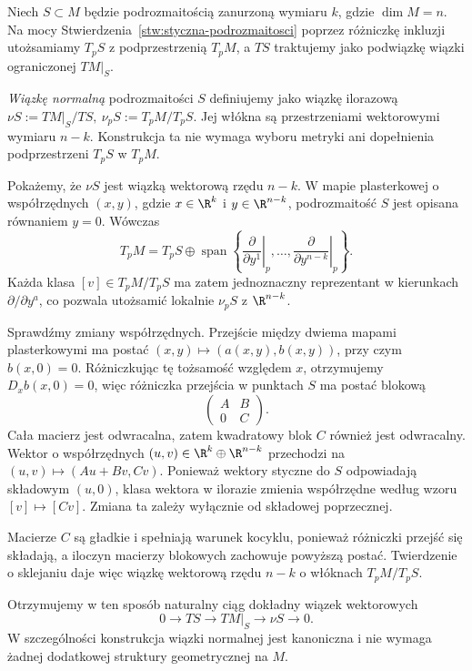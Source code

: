\begin{przyklad}
Niech $S\subset M$ będzie podrozmaitością zanurzoną wymiaru $k$,
gdzie $\dim M=n$. Na mocy Stwierdzenia~\ref{stw:styczna-podrozmaitosci}
poprzez różniczkę inkluzji utożsamiamy
$T_pS$ z podprzestrzenią $T_pM$, a $TS$ traktujemy jako
podwiązkę wiązki ograniczonej $TM|_S$.

\emph{Wiązkę normalną} podrozmaitości $S$ definiujemy jako
wiązkę ilorazową $\nu S:=TM|_S/TS, \ \nu_pS:=T_pM/T_pS$.
Jej włókna są przestrzeniami wektorowymi wymiaru $n-k$.
Konstrukcja ta nie wymaga wyboru metryki ani dopełnienia
podprzestrzeni $T_pS$ w $T_pM$.

Pokażemy, że $\nu S$ jest wiązką wektorową rzędu $n-k$.
W mapie plasterkowej o współrzędnych $(x,y)$, gdzie
$x\in\R^k$ i $y\in\R^{n-k}$, podrozmaitość $S$ jest
opisana równaniem $y=0$. Wówczas
\[
T_pM=T_pS\oplus
\operatorname{span}\left\{
\left.\frac{\partial}{\partial y^1}\right|_p,
\ldots,
\left.\frac{\partial}{\partial y^{n-k}}\right|_p
\right\}.
\]
Każda klasa $[v]\in T_pM/T_pS$ ma zatem jednoznaczny
reprezentant w kierunkach $\partial/\partial y^a$,
co pozwala utożsamić lokalnie $\nu_pS$ z $\R^{n-k}$.

Sprawdźmy zmiany współrzędnych. Przejście między dwiema
mapami plasterkowymi ma postać $(x,y)\longmapsto(a(x,y),b(x,y))$,
przy czym $b(x,0)=0$. Różniczkując tę tożsamość
względem $x$, otrzymujemy $D_xb(x,0)=0$, więc
różniczka przejścia w punktach $S$ ma postać blokową
\[
\begin{pmatrix}
A&B\\
0&C
\end{pmatrix}.
\]
Cała macierz jest odwracalna, zatem kwadratowy blok
$C$ również jest odwracalny. Wektor o współrzędnych
$(u,v)\in\R^k\oplus\R^{n-k}$ przechodzi na $(u,v)\longmapsto(Au+Bv,Cv)$.
Ponieważ wektory styczne do $S$ odpowiadają
składowym $(u,0)$, klasa wektora w ilorazie
zmienia współrzędne według wzoru $[v]\longmapsto[Cv]$.
Zmiana ta zależy wyłącznie od składowej poprzecznej.

Macierze $C$ są gładkie i spełniają warunek kocyklu,
ponieważ różniczki przejść się składają, a iloczyn
macierzy blokowych zachowuje powyższą postać.
Twierdzenie o sklejaniu daje więc wiązkę wektorową
rzędu $n-k$ o włóknach $T_pM/T_pS$.

Otrzymujemy w ten sposób naturalny ciąg dokładny
wiązek wektorowych
\[
0\longrightarrow TS
\longrightarrow TM|_S
\longrightarrow \nu S
\longrightarrow 0.
\]
W szczególności konstrukcja wiązki normalnej jest
kanoniczna i nie wymaga żadnej dodatkowej struktury
geometrycznej na $M$.
\end{przyklad}


